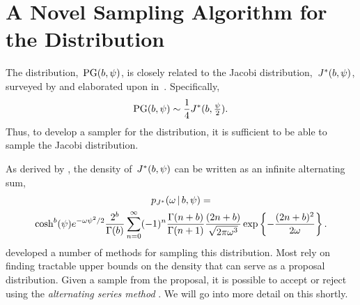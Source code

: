 \section{A Novel Sampling Algorithm for the \polyagamma Distribution}
\label{sec:pgsampling}

The \polyagamma distribution,~$\mathrm{PG}(b,\psi)$, is closely related 
to the Jacobi distribution,~$J^{*}(b,\psi)$, surveyed by \citet{biane2001probability} and 
elaborated upon in~\citet{windle2014sampling}.
Specifically, 
\begin{align*}
  \mathrm{PG}(b, \psi) \sim \frac{1}{4} J^{*}(b, \tfrac{\psi}{2}).
\end{align*}
Thus, to develop a sampler for the \polyagamma distribution, 
it is sufficient to be able to sample the Jacobi distribution.

As derived by \citet{windle2014sampling}, the density
of~$J^{*}(b,\psi)$ can be written as an infinite alternating
sum,
\begin{multline}
  \label{eq:jacobi_density}
  p_{J^{*}}({\omega} \,|\, b, \psi) = \\ 
  \cosh^b(\psi) e^{-{\omega} \psi^2/2} \frac{2^b}{\Gamma(b)} 
  \sum_{n=0}^\infty (-1)^n \frac{\Gamma(n+b)}{\Gamma(n+1)} \frac{(2n+b)}{\sqrt{2\pi {\omega}^3}}
  \exp\left\{- \frac{(2n+b)^2}{2{\omega}} \right\}.
\end{multline}
\citet{windle2014sampling} developed a number of methods for sampling
this distribution. Most rely on finding tractable upper bounds on the density
that can serve as a proposal distribution. Given a sample from the proposal,
it is possible to accept or reject using the \emph{alternating series method} \citep{devroye1986}. We will go into more detail on this shortly.

